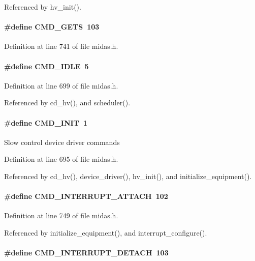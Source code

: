 Referenced by hv\_\-init().
\paragraph[{CMD\_\-GETS}]{\setlength{\rightskip}{0pt plus 5cm}\#define CMD\_\-GETS~103}\hfill\label{group__err26_ga22c5f99754ed25156f612c41ca51d044}


Definition at line 741 of file midas.h.
\paragraph[{CMD\_\-IDLE}]{\setlength{\rightskip}{0pt plus 5cm}\#define CMD\_\-IDLE~5}\hfill\label{group__err26_ga433697a25587c6ffe8a14f02e5be9066}


Definition at line 699 of file midas.h.

Referenced by cd\_\-hv(), and scheduler().
\paragraph[{CMD\_\-INIT}]{\setlength{\rightskip}{0pt plus 5cm}\#define CMD\_\-INIT~1}\hfill\label{group__err26_ga2677fc43f8393bcf3bafc8bbface003f}
Slow control device driver commands 

Definition at line 695 of file midas.h.

Referenced by cd\_\-hv(), device\_\-driver(), hv\_\-init(), and initialize\_\-equipment().
\paragraph[{CMD\_\-INTERRUPT\_\-ATTACH}]{\setlength{\rightskip}{0pt plus 5cm}\#define CMD\_\-INTERRUPT\_\-ATTACH~102}\hfill\label{group__err26_ga8a891110d186a3a4b02f6dfde253efb2}


Definition at line 749 of file midas.h.

Referenced by initialize\_\-equipment(), and interrupt\_\-configure().
\paragraph[{CMD\_\-INTERRUPT\_\-DETACH}]{\setlength{\rightskip}{0pt plus 5cm}\#define CMD\_\-INTERRUPT\_\-DETACH~103}\hfill\label{group__err26_gae055008eb0238aaf491eda741abcd26d}


